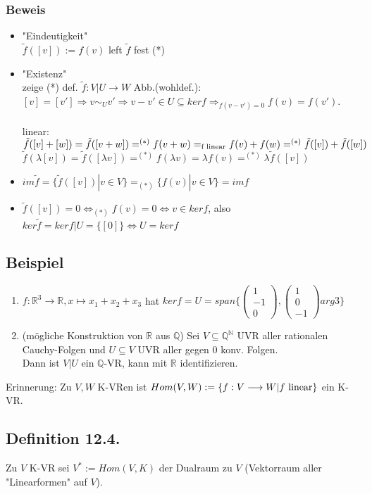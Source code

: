 \documentclass[a4paper, 12pt]{extarticle}
\newcommand{\vecThree}[3] {
	\left( 
	\begin{matrix}
		#1\\
		#2\\
		#3
	\end{matrix} 
	\right)
}
\newcommand{\gdw}{\Leftrightarrow}
\newcommand{\tn}[1]{\textnormal {#1}}
\begin{document}
\subsubsection*{Beweis}
\begin{itemize}
	\item "Eindeutigkeit" \\
	$\tilde f([v]) := f(v)$ left $\tilde f$ fest (*)
	\item "Existenz" \\
	zeige (*) def. $\tilde f:V|U\to W$ Abb.(wohldef.): \\
	$[v] =[v'] \Rightarrow v\sim_U v' \Rightarrow v-v'\in U \subseteq kerf \Rightarrow_{f(v-v')=0} f(v) = f(v')$. \\ \\
	linear:$\tilde f ([v] + [w]) = \tilde f ([v+w]) =^{(*)} f(v+w) = _{\tn{f linear}} f(v) + f(w) =^{(*)} \tilde f([v]) + \tilde f([w])$ \\
	$\tilde f(\lambda [v]) = \tilde f([\lambda v]) =^{(*)} f(\lambda v) = \lambda f(v) =^{(*)} \lambda \tilde f([v])$
	\item
	$im\tilde f = \{\tilde f([v]) | v\in V\} =_{(*)} \{f(v) | v\in V\} = imf$
	\item 
	$\tilde f([v]) = 0 \gdw_{(*)} f(v) = 0 \gdw v\in kerf$, also $ker \tilde f = ker f|U = \{[0]\} \gdw U = kerf$
\end{itemize}
\subsection*{Beispiel}
\begin{enumerate}[label=\arabic*)]
	\item $f:\mathbb R^3\to \mathbb R, x\mapsto x_1+x_2+x_3$ hat $kerf = U = span\{\vecThree{1}{-1}{0}, \vecThree{1}0{-1}{arg3}\}$
	\item (mögliche Konstruktion von $\mathbb R$ aus $\mathbb Q$) Sei $V\subseteq \mathbb Q^\mathbb N$ UVR aller rationalen Cauchy-Folgen und $U\subseteq V$ UVR aller gegen 0 konv. Folgen.\\
	Dann ist $V|U$ ein $\mathbb Q$-VR, kann mit $\mathbb R$ identifizieren.
\end{enumerate}
Erinnerung: Zu $V, W$ K-VRen ist $Hom(V, W) := \{f:V\longrightarrow W | f \tn{ linear}\}$ ein K-VR.
\subsection*{Definition 12.4.}
Zu $V$ K-VR sei $V^* := Hom(V, K)$ der Dualraum zu $V$ (Vektorraum aller "Linearformen" auf $V$).
\end{document}
